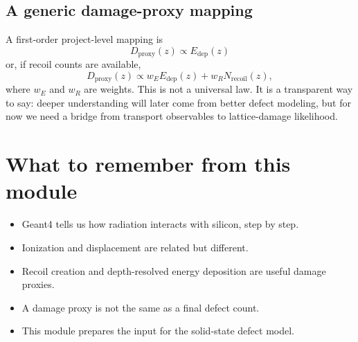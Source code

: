 \documentclass[11pt]{article}
\begin{document}
\subsection{A generic damage-proxy mapping}
A first-order project-level mapping is
\begin{equation}
D_{\mathrm{proxy}}(z) \propto E_{\mathrm{dep}}(z)
\end{equation}
or, if recoil counts are available,
\begin{equation}
D_{\mathrm{proxy}}(z) \propto w_E E_{\mathrm{dep}}(z) + w_R N_{\mathrm{recoil}}(z),
\end{equation}
where $w_E$ and $w_R$ are weights. This is not a universal law. It is a transparent way to say: deeper understanding will later come from better defect modeling, but for now we need a bridge from transport observables to lattice-damage likelihood.

\section{What to remember from this module}
\begin{itemize}
    \item Geant4 tells us how radiation interacts with silicon, step by step.
    \item Ionization and displacement are related but different.
    \item Recoil creation and depth-resolved energy deposition are useful damage proxies.
    \item A damage proxy is not the same as a final defect count.
    \item This module prepares the input for the solid-state defect model.
\end{itemize}
\end{document}
